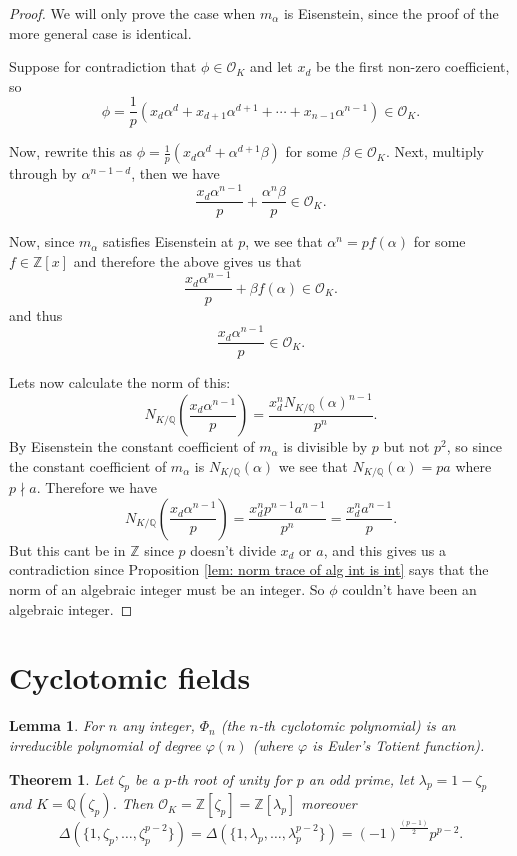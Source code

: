 \documentclass[11pt,a4paper]{amsart}
\theoremstyle{plain}
\newtheorem{thm}[subsection]{Theorem}
\newtheorem{lem}[subsection]{Lemma}
\theoremstyle{definition}
\theoremstyle{definition}
\newcommand{\ZZ}{\mathbb{Z}}
\def\QQ{\mathbb{Q}}
\def \a{\alpha}
\def \lam {\lambda}
\def \OO {\mathcal{O}}
\begin{document}
	
	\begin{proof}
		We will only prove the case when $m_\a$ is Eisenstein, since the proof of the more general case is identical.	
		
		Suppose for contradiction that $\phi \in \OO_K$ and let $x_d$ be the first non-zero coefficient, so \[\phi=\frac{1}{p}(x_d\a^d+x_{d+1}\a^{d+1}+\cdots+x_{n-1}\a^{n-1}) \in \OO_K.\]
		
		Now, rewrite this as $\phi=\frac{1}{p}(x_d\a^d +\a^{d+1}\beta)$ for some $\beta \in \OO_K$. Next, multiply through by $\a^{n-1-d}$, then we have \[\frac{x_d\a^{n-1}}{p}+\frac{\a^n\beta}{p} \in \OO_K.\]
		
		Now, since  $m_\a$ satisfies Eisenstein at $p$, we see that $\a^n=pf(\a)$ for some $f \in \ZZ[x]$ and therefore the above gives us that \[\frac{x_d\a^{n-1}}{p}+\beta f(\a) \in \OO_K.\] and thus \[\frac{x_d\a^{n-1}}{p} \in \OO_K.\]
		
		Lets now calculate the norm of this: \[N_{K/\QQ} \left(\frac{x_d\a^{n-1}}{p} \right)=\frac{x_d^n N_{K/\QQ}(\a)^{n-1}}{p^n}.\] By Eisenstein the constant coefficient of $m_\a$ is divisible by $p$ but not $p^2$, so since the constant coefficient of $m_\a$ is $N_{K/\QQ}(\a)$ we see that $N_{K/\QQ}(\a)=p a$ where $p \nmid a$. Therefore we have \[N_{K/\QQ} \left(\frac{x_d\a^{n-1}}{p} \right)=\frac{x_d^n p^{n-1}a^{n-1}}{p^n}= \frac{x_d^n a^{n-1}}{p}.\] But this cant be in $\ZZ$ since $p$ doesn't divide $x_d$ or $a$, and this gives us a contradiction since  Proposition \ref{lem: norm trace of alg int is int} says that the norm of an algebraic integer must be an integer. So $\phi$ couldn't have been an algebraic integer. 
		
		
	\end{proof}	
	
	\section{Cyclotomic fields}
	
	
	\begin{lem}\label{lem: cyclo poly}
		For $n$ any integer, $\Phi_n$ (the $n$-th cyclotomic polynomial) is an irreducible polynomial of degree $\varphi(n)$ (where $\varphi$ is Euler's Totient function).
	\end{lem}
	
	
	
	
	\begin{thm}\label{thm: ring of ints of cyclo}
		Let $\zeta_p$ be a $p$-th root of unity for $p$ an odd prime, let $\lam_p=1-\zeta_p$ and $K=\QQ(\zeta_p)$. Then $\OO_K=\ZZ[\zeta_p]=\ZZ[\lam_p]$ moreover \[\Delta(\{1,\zeta_p,\dots,\zeta_p^{p-2}\})=\Delta(\{1,\lam_p,\dots,\lam_p^{p-2}\})=(-1)^{\frac{(p-1)}{2}}p^{p-2}.\]
	\end{thm}	
	
\end{document}
